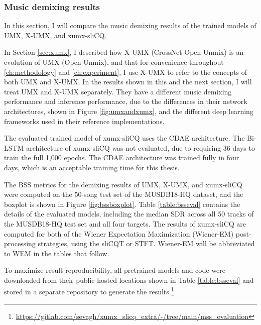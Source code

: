 \documentclass[report.tex]{subfiles}
\begin{document}
\subsubsection{Music demixing results}
\label{sec:demixresults}

In this section, I will compare the music demixing results of the trained models of UMX, X-UMX, and xumx-sliCQ.

In Section \ref{sec:xumx}, I described how X-UMX (CrossNet-Open-Unmix) is an evolution of UMX (Open-Unmix), and that for convenience throughout  \ref{ch:methodology} and  \ref{ch:experiment}, I  use X-UMX to refer to the concepts of both UMX and X-UMX. In the results shown in this and the next section, I will treat UMX and X-UMX separately. They have a different music demixing performance and inference performance, due to the differences in their network architectures, shown in Figure \ref{fig:umxandxumx}, and the different deep learning frameworks used in their reference implementations.

The evaluated trained model of xumx-sliCQ uses the CDAE architecture. The Bi-LSTM architecture of xumx-sliCQ was not evaluated, due to requiring 36 days to train the full 1,000 epochs. The CDAE architecture was trained fully in four days, which is an acceptable training time for this thesis.

The BSS metrics for the demixing results of UMX, X-UMX, and xumx-sliCQ were computed on the 50-song test set of the MUSDB18-HQ dataset, and the boxplot is shown in Figure \ref{fig:bssboxplot}. Table \ref{table:bsseval} contains the details of the evaluated models, including the median SDR across all 50 tracks of the MUSDB18-HQ test set and all four targets. The results of xumx-sliCQ are computed for both of the Wiener Expectation Maximization (Wiener-EM) post-processing strategies, using the sliCQT or STFT. Wiener-EM will be abbreviated to WEM in the tables that follow.

To maximize result reproducibility, all pretrained models and code were downloaded from their public hosted locations shown in Table \ref{table:bsseval} and stored in a separate repository to generate the results.\footnote{\url{https://gitlab.com/sevagh/xumx_slicq_extra/-/tree/main/mss_evaluation}}
\end{document}
